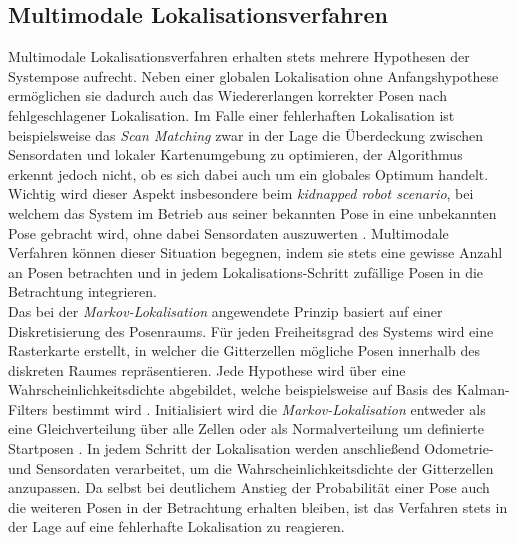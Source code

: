 \subsection{Multimodale Lokalisationsverfahren}
Multimodale Lokalisationsverfahren erhalten stets mehrere Hypothesen der Systempose aufrecht. Neben einer globalen Lokalisation ohne Anfangshypothese ermöglichen sie dadurch auch das Wiedererlangen korrekter Posen nach fehlgeschlagener Lokalisation. Im Falle einer fehlerhaften Lokalisation ist beispielsweise das \textit{Scan Matching} zwar in der Lage die Überdeckung zwischen Sensordaten und lokaler Kartenumgebung zu optimieren, der Algorithmus erkennt jedoch nicht, ob es sich dabei auch um ein globales Optimum handelt. Wichtig wird dieser Aspekt insbesondere beim \textit{kidnapped robot scenario}, bei welchem das System im Betrieb aus seiner bekannten Pose in eine unbekannten Pose gebracht wird, ohne dabei Sensordaten auszuwerten \cite{Yic2011}. Multimodale Verfahren können dieser Situation begegnen, indem sie stets eine gewisse Anzahl an Posen betrachten und in jedem Lokalisations-Schritt zufällige Posen in die Betrachtung integrieren.\\

Das bei der \textit{Markov-Lokalisation} angewendete Prinzip basiert auf einer Diskretisierung des Posenraums. Für jeden Freiheitsgrad des Systems wird eine Rasterkarte erstellt, in welcher die Gitterzellen mögliche Posen innerhalb des diskreten Raumes repräsentieren. Jede Hypothese wird über eine Wahrscheinlichkeitsdichte abgebildet, welche beispielsweise auf Basis des Kalman-Filters bestimmt wird \cite{Hertzberg2012}. Initialisiert wird die \textit{Markov-Lokalisation} entweder als eine Gleichverteilung über alle Zellen oder als Normalverteilung um definierte Startposen \cite{Hertzberg2012}. In jedem Schritt der Lokalisation werden anschließend Odometrie- und Sensordaten verarbeitet, um die Wahrscheinlichkeitsdichte der Gitterzellen anzupassen. Da selbst bei deutlichem Anstieg der Probabilität einer Pose auch die weiteren Posen in der Betrachtung erhalten bleiben, ist das Verfahren stets in der Lage auf eine fehlerhafte Lokalisation zu reagieren.\\



